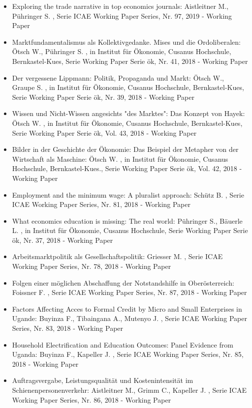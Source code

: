 \begin{itemize}
\item Exploring the trade narrative in top economics journals: Aistleitner M., Pühringer S. , Serie ICAE Working Paper Series, Nr. 97, 2019 - Working Paper
\item Marktfundamentalismus als Kollektivgedanke. Mises und die Ordoliberalen: Ötsch W., Pühringer S. , in Institut für Ökonomie, Cusanus Hochschule, Bernkastel-Kues, Serie Working Paper Serie ök, Nr. 41, 2018 - Working Paper
\item Der vergessene Lippmann: Politik, Propaganda und Markt: Ötsch W., Graupe S. , in Institut für Ökonomie, Cusanus Hochschule, Bernkastel-Kues, Serie Working Paper Serie ök, Nr. 39, 2018 - Working Paper
\item Wissen und Nicht-Wissen angesichts "des Marktes": Das Konzept von Hayek: Ötsch W. , in Institut für Ökonomie, Cusanus Hochschule, Bernkastel-Kues, Serie Working Paper Serie ök, Vol. 43, 2018 - Working Paper
\item Bilder in der Geschichte der Ökonomie: Das Beispiel der Metapher von der Wirtschaft als Maschine: Ötsch W. , in Institut für Ökonomie, Cusanus Hochschule, Bernkastel-Kues., Serie Working Paper Serie ök, Vol. 42, 2018 - Working Paper
\item Employment and the minimum wage: A pluralist approach: Schütz B. , Serie ICAE Working Paper Series, Nr. 81, 2018 - Working Paper
\item What economics education is missing: The real world: Pühringer S., Bäuerle L. , in Institut für Ökonomie, Cusanus Hochschule, Serie Working Paper Serie ök, Nr. 37, 2018 - Working Paper
\item Arbeitsmarktpolitik als Gesellschaftspolitik: Griesser M. , Serie ICAE Working Paper Series, Nr. 78, 2018 - Working Paper
\item Folgen einer möglichen Abschaffung der Notstandshilfe in Oberösterreich: Foissner F. , Serie ICAE Working Paper Series, Nr. 87, 2018 - Working Paper
\item Factors Affecting Acces to Formal Credit by Micro and Small Enterprises in Ugande: Buyinza F., Tibaingana A., Mutenyo J. , Serie ICAE Working Paper Series, Nr. 83, 2018 - Working Paper
\item Household Electrification and Education Outcomes: Panel Evidence from Uganda: Buyinza F., Kapeller J. , Serie ICAE Working Paper Series, Nr. 85, 2018 - Working Paper
\item Auftragsvergabe, Leistungsqualität und Kostenintensität im Schienenpersonenverkehr: Aistleitner M., Grimm C., Kapeller J. , Serie ICAE Working Paper Series, Nr. 86, 2018 - Working Paper

\end{itemize}
